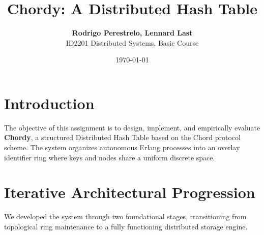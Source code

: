 \documentclass[a4paper, 11pt]{article}
\title{\textbf{Chordy: A Distributed Hash Table}}
\author{\textbf{Rodrigo Perestrelo, Lennard Last} \\ ID2201 Distributed Systems, Basic Course}
\date{\today{}}
\begin{document}
\maketitle

\section{Introduction}

The objective of this assignment is to design, implement, and empirically evaluate \textbf{Chordy}, a structured Distributed Hash Table based on the Chord protocol scheme. The system organizes autonomous Erlang processes into an overlay identifier ring where keys and nodes share a uniform discrete space.

\section{Iterative Architectural Progression}

We developed the system through two foundational stages, transitioning from topological ring maintenance to a fully functioning distributed storage engine.
\end{document}
